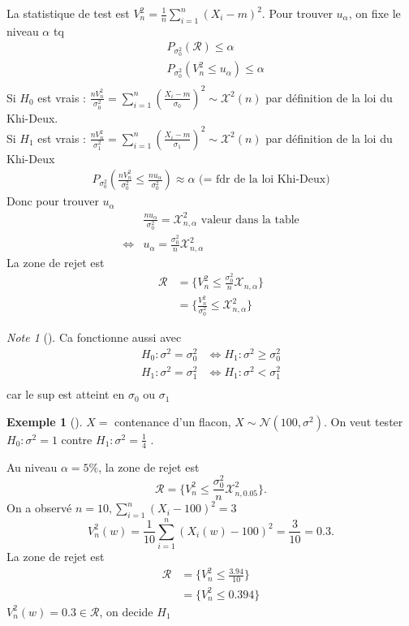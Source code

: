 \documentclass{article}
\theoremstyle{plain}%
\theoremstyle{definition}
\newtheorem{exmp}{Exemple}[section]
\theoremstyle{remark}
\newtheorem*{note}{Note}
\begin{document}
La statistique de test est $ V_n^2 = \frac{1}{n}\sum_{i=1}^{n}(X_i -m )^2 $. Pour trouver $ u_\alpha  $, on fixe le niveau $ \alpha  $ tq 
\begin{align*}
    &P_{\sigma _0^2} (\mathcal{R}) \leq \alpha \\
    &P_{\sigma _0^2} (V_n^2 \leq u_\alpha ) \leq \alpha \\
\end{align*}
Si $ H_0 $ est vrais : $ \frac{nV_n^2}{\sigma _0^2} = \sum_{i=1}^{n} (\frac{X_i - m}{\sigma _0})^2 \sim \mathcal{X}^2(n) $ par définition de la loi du Khi-Deux. \\
Si $ H_1 $ est vrais : $ \frac{nV_n^2}{\sigma _1^2} = \sum_{i=1}^{n} (\frac{X_i - m}{\sigma _1})^2 \sim \mathcal{X}^2(n) $ par définition de la loi du Khi-Deux 
\begin{align*}
    P_{\sigma _0^2} (\frac{n V_n^2}{\sigma _0^2} \leq \frac{n u_\alpha }{\sigma _0^2}) \approx \alpha \text{ (= fdr de la loi Khi-Deux)}
\end{align*}
Donc pour trouver $ u_\alpha  $ 
\begin{align*}
    &\frac{n u_\alpha }{\sigma_0 ^2} = \mathcal{X}^2_{n,\alpha } \text{ valeur dans la table} \\
    \Leftrightarrow & u_\alpha = \frac{\sigma _0 ^2}{n} \mathcal{X}^2_{n,\alpha }
\end{align*}
La zone de rejet est 
\begin{align*}
    \mathcal{R} &= \{V_n^2 \leq \frac{\sigma ^2_0}{n}\mathcal{X}_{n,\alpha }\} \\
    &= \{ \frac{ V_n^2}{\sigma _0^2} \leq \mathcal{X}^2_{n,\alpha }\}
\end{align*}

\begin{note}[]
    Ca fonctionne aussi avec 
    \begin{align*}
        H_0: \sigma ^2 = \sigma _0^2 &\Leftrightarrow H_1: \sigma^2 \geq \sigma _0^2 \\
        H_1: \sigma ^2 = \sigma _1^2 &\Leftrightarrow H_1: \sigma^2 < \sigma _1^2 \\
    \end{align*}
    car le sup est atteint en $ \sigma _0 $ ou $ \sigma _1 $ 
\end{note}

\begin{exmp}[]
    $ X= $ contenance d'un flacon, $ X \sim \mathcal{N}(100, \sigma ^2) $. On veut tester $ H_0: \sigma ^2=1 $ contre $ H_1: \sigma ^2 = \frac{1}{4} $ . 

    Au niveau $ \alpha =5\% $, la zone de rejet est 
    \[
        \mathcal{R} = \{V_n^2 \leq \frac{\sigma _0^2}{n} \mathcal{X}^2_{n, 0.05}\}
    .\]
    On a observé $ n=10, \sum_{i=1}^{n}(X_i - 100)^2 = 3 $ 
    \[
        V_n^2(w) = \frac{1}{10}\sum_{i=1}^{n}(X_i(w) - 100)^2 = \frac{3}{10} = 0.3
    .\]
    La zone de rejet est 
    \begin{align*}
        \mathcal{R} &=\{V_n^2 \leq \frac{3.94}{10}\} \\
                    &= \{V_n^2 \leq 0.394\}
    \end{align*}
    $ V_n^2(w)=0.3 \in \mathcal{R} $, on decide $ H_1 $ 
\end{exmp}
\end{document}
